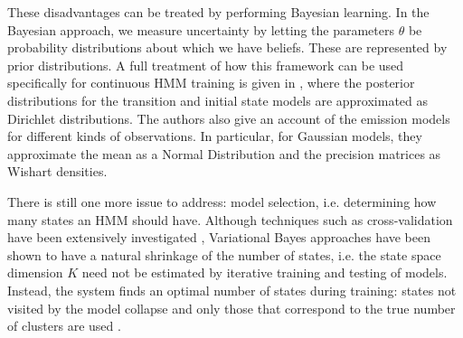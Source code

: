 \documentclass[pdftex,11pt,a4paper]{article}
\theoremstyle{definition}
\theoremstyle{remark}
\begin{document}
\par These disadvantages can be treated by performing Bayesian learning. In the Bayesian approach, we measure uncertainty by letting the parameters $\theta$ be probability distributions about which we have beliefs. These are represented by prior distributions. A full treatment of how this framework can be used specifically for continuous HMM training is given in \cite{Rezek2005}, where the posterior distributions for the transition and initial state models are approximated as Dirichlet distributions. The authors also give an account of the emission models for different kinds of observations. In particular, for Gaussian models, they approximate the mean as a Normal Distribution and the precision matrices as Wishart densities. 
\par There is still one more issue to address: model selection, i.e. determining how many states an HMM should have. Although techniques such as cross-validation have been extensively investigated \cite{Siddiqi2007,Rezek2005}, Variational Bayes approaches have been shown to have a natural shrinkage of the number of states, i.e. the state space dimension $K$ need not be estimated by iterative training and testing of models. Instead, the system finds an optimal number of states during training: states not visited by the model collapse and only those that correspond to the true number of clusters are used \cite{Rezek2005}. 
\end{document}
